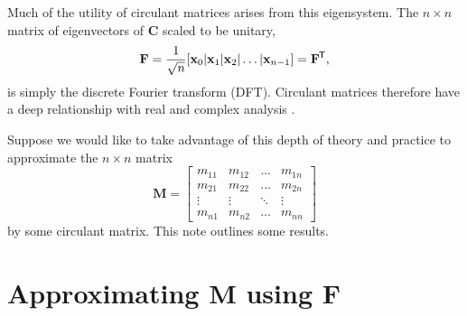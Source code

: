 \documentclass[letterpaper,12pt,oneside,final]{article}
\newcommand{\ve}[1]{\mathbf{#1}}           %
\newcommand{\m}[1]{\mathbf{#1}}               %
\newcommand{\tr}[1]{{#1}^{\mkern-1.5mu\mathsf{T}}}              %
\begin{document}
Much of the utility of circulant matrices arises from this eigensystem. The $n \times n$ matrix of eigenvectors of $\m{C}$ scaled to be unitary,
\begin{equation} \label{eq:DFT}
  \m{F} = \frac{1}{\sqrt{n}} [\ve{x}_0 | \ve{x}_1 | \ve{x}_2 | \dots | \ve{x}_{n-1} ] = \tr{\m{F}},
\end{equation}
is simply the discrete Fourier transform (DFT). Circulant matrices therefore have a deep relationship with real and complex analysis \cite{grenanderszego1958}.

Suppose we would like to take advantage of this depth of theory and practice to approximate the $n \times n$ matrix
\begin{equation} \label{eq:Mdefn}
  \m{M} = \begin{bmatrix}
    m_{11} & m_{12} & \dots & m_{1n} \\
    m_{21} & m_{22} & \dots & m_{2n} \\
    \vdots & \vdots & \ddots & \vdots \\
    m_{n1} & m_{n2} & \dots & m_{nn}
  \end{bmatrix}
\end{equation}
by some circulant matrix. This note outlines some results.

\section{Approximating $\m{M}$ using $\m{F}$} \label{sec:approximatingM}
\end{document}
